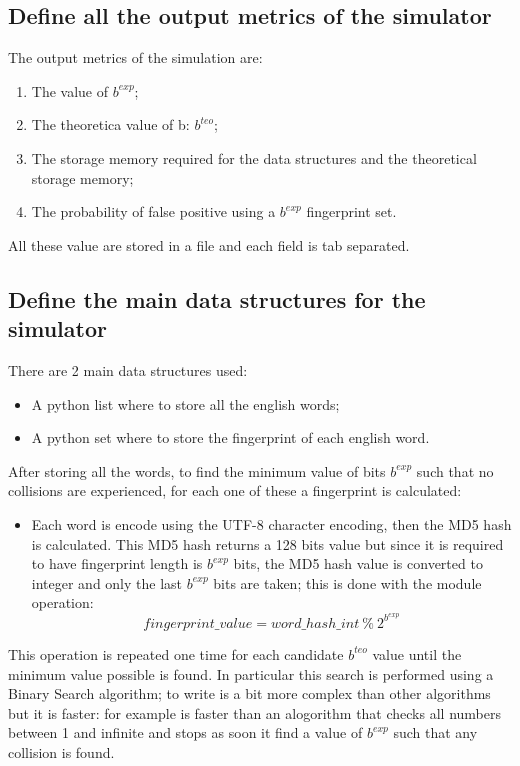 \documentclass{report}
\begin{document}
{				\subsection{Define all the output metrics of the simulator}
					The output metrics of the simulation are:
					\begin{enumerate}
							\item The value of $b^{exp}$;
							\item The theoretica value of b: $b^{teo}$;
							\item The storage  memory required for the data structures and the theoretical storage memory;
							\item The probability of false positive using a  $b^{exp}$ fingerprint set.
					\end{enumerate}
					All these value are stored in a file and each field is tab separated.
			
			\subsection{Define the main data structures for the simulator}
						There are 2 main data structures used: 
							\begin{itemize}
								\item A python list where to store all the english words;
								\item A python set where to store the fingerprint of each english word.
								\end{itemize}
						After storing all the words, to find the minimum value of bits $b^{exp}$ such that no collisions are experienced, for each one of these a fingerprint is calculated:
						\begin{itemize}
								\item[] Each word is encode using the UTF-8 character encoding, then the MD5 hash is calculated. This MD5 hash returns a 128 bits value but since it is required to have fingerprint length is $b^{exp}$ bits, the MD5 hash value is converted to integer and only the last  $b^{exp}$ bits are taken; this is done with the module operation: \[ fingerprint\_value = word\_hash\_int \: \% \: 2^{b^{exp}} \]
						\end{itemize}
						This operation is repeated one time for each candidate $b^{teo}$ value until the minimum value possible is found. In particular this search is performed using a Binary Search algorithm; to write is a bit more complex than other algorithms but it is faster: for example is faster than an alogorithm that checks all numbers between 1 and infinite and stops as soon it find a value of $b^{exp}$ such that any collision is found.
					
}
\end{document}
